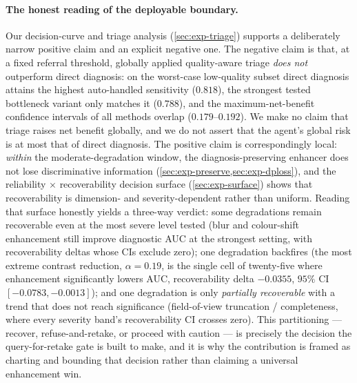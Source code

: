 \paragraph{The honest reading of the deployable boundary.}
Our decision-curve and triage analysis (\cref{sec:exp-triage}) supports a deliberately
narrow positive claim and an explicit negative one. The negative claim is that, at a
fixed referral threshold, globally applied quality-aware triage \emph{does not}
outperform direct diagnosis: on the worst-case low-quality subset direct diagnosis
attains the highest auto-handled sensitivity ($0.818$), the strongest tested bottleneck
variant only matches it ($0.788$), and the maximum-net-benefit confidence intervals of
all methods overlap ($0.179$--$0.192$). We make no claim that triage raises net benefit
globally, and we do not assert that the agent's global risk is at most that of direct
diagnosis. The positive claim is correspondingly local: \emph{within} the
moderate-degradation window, the diagnosis-preserving enhancer does not lose
discriminative information (\cref{sec:exp-preserve,sec:exp-dploss}), and the
reliability $\times$ recoverability decision surface (\cref{sec:exp-surface}) shows that
recoverability is dimension- and severity-dependent rather than uniform. Reading that
surface honestly yields a three-way verdict: some degradations remain recoverable even
at the most severe level tested (blur and colour-shift enhancement still improve
diagnostic AUC at the strongest setting, with recoverability deltas whose CIs exclude
zero); one degradation backfires (the most extreme contrast reduction, $\alpha=0.19$,
is the single cell of twenty-five where enhancement significantly lowers AUC,
recoverability delta $-0.0355$, $95\%$ CI $[-0.0783,-0.0013]$); and one degradation is
only \emph{partially recoverable} with a trend that does not reach significance
(field-of-view truncation / completeness, where every severity band's recoverability
CI crosses zero). This partitioning --- recover, refuse-and-retake, or proceed with
caution --- is precisely the decision the query-for-retake gate is built to make, and
it is why the contribution is framed as charting and bounding that decision rather than
claiming a universal enhancement win.


